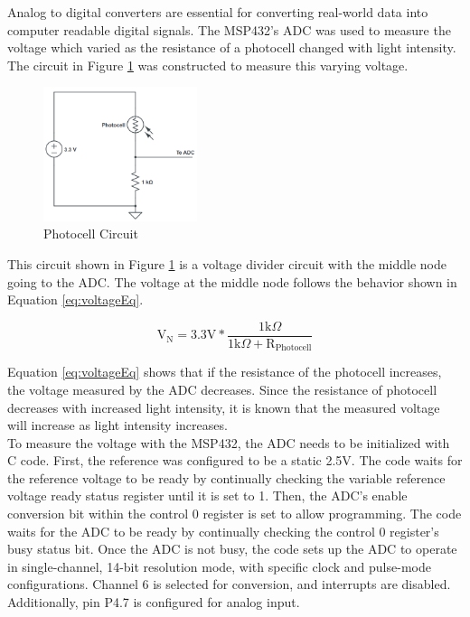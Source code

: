 \documentclass[CMPE]{KGCOEReport}
\begin{document}
Analog to digital converters are essential for converting real-world data into computer readable digital signals. The MSP432's ADC was used to measure the voltage which varied as the resistance of a photocell changed with light intensity. The circuit in Figure \ref{fig:photocell} was constructed to measure this varying voltage.

\begin{figure}[H]
    \centering
    \includegraphics[width=0.4\textwidth]{photocellCircuit.png}
    \caption{Photocell Circuit}
    \label{fig:photocell}
\end{figure}

This circuit shown in Figure \ref{fig:photocell} is a voltage divider circuit with the middle node going to the ADC. The voltage at the middle node follows the behavior shown in Equation \ref{eq:voltageEq}.

\begin{equation}
\text{V}_\text{N} = 3.3\text{V} * \frac{1\text{k}\Omega}{1\text{k}\Omega + \text{R}_\text{Photocell}} \label{eq:voltageEq}
\end{equation}

Equation \ref{eq:voltageEq} shows that if the resistance of the photocell increases, the voltage measured by the ADC decreases. Since the resistance of photocell decreases with increased light intensity, it is known that the measured voltage will increase as light intensity increases.\\

To measure the voltage with the MSP432, the ADC needs to be initialized with C code. First, the reference was configured to be a static 2.5V. The code waits for the reference voltage to be ready by continually checking the variable reference voltage ready status register until it is set to 1. Then, the ADC's enable conversion bit within the control 0 register is set to allow programming. The code waits for the ADC to be ready by continually checking the control 0 register's busy status bit. Once the ADC is not busy, the code sets up the ADC to operate in single-channel, 14-bit resolution mode, with specific clock and pulse-mode configurations. Channel 6 is selected for conversion, and interrupts are disabled. Additionally, pin P4.7 is configured for analog input.\\
\end{document}
